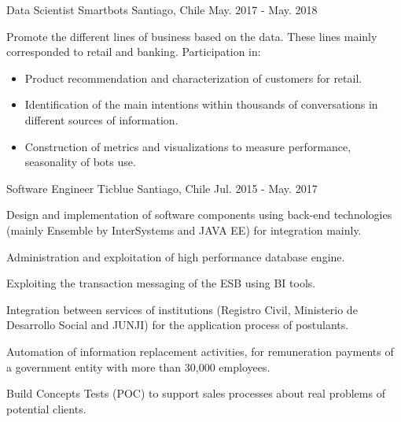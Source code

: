 \begin{cventries}
  \cventry
    {Data Scientist} %
    {Smartbots} %
    {Santiago, Chile} %
    {May. 2017 - May. 2018} %
    {
      \begin{cvitems} %
        \item {Promote the different lines of business based on the data. These lines mainly corresponded to retail and banking. Participation in:}
      	\begin{itemize}
        	\item{Product recommendation and characterization of customers for retail.}
        	\item{Identification of the main intentions within thousands of conversations in different sources of information.}
        	\item{Construction of metrics and visualizations to measure performance, seasonality of bots use.}
      	\end{itemize}
      \end{cvitems}
    }

  \cventry
    {Software Engineer} %
    {Ticblue} %
    {Santiago, Chile} %
    {Jul. 2015 - May. 2017} %
    {
      \begin{cvitems} %
        \item {Design and implementation of software components using back-end technologies (mainly Ensemble by InterSystems and JAVA EE) for integration mainly.}
        \item {Administration and exploitation of high performance database engine.}
        \item {Exploiting the transaction messaging of the ESB using BI tools.}
        \item {Integration between services of institutions (Registro Civil, Ministerio de Desarrollo Social and JUNJI) for the application process of postulants.}
        \item {Automation of information replacement activities, for remuneration payments of a government entity with more than 30,000 employees.}
        \item {Build Concepts Tests (POC) to support sales processes about real problems of potential clients.}
      \end{cvitems}
    }

\end{cventries}
